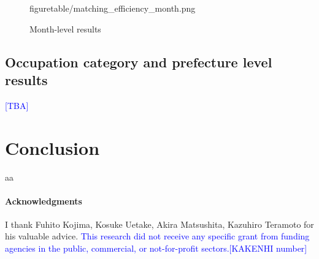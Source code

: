 \documentclass[12pt]{article}
\begin{document}
\begin{figure}[!ht]
\begin{center}
{  {figuretable/matching_efficiency_month.png}}
  \\
  \caption{Month-level results}
  \label{fg:month_level_results} 
  \end{center}
  \footnotesize
\end{figure} 

\subsection{Occupation category and prefecture level results}

\textcolor{blue}{[TBA]}

\section{Conclusion}

aa


\paragraph{Acknowledgments}
I thank Fuhito Kojima, Kosuke Uetake, Akira Matsushita, Kazuhiro Teramoto for his valuable advice. \textcolor{blue}{This research did not receive any specific grant from funding agencies in the public, commercial, or not-for-profit sectors.[KAKENHI number]}





\end{document}
